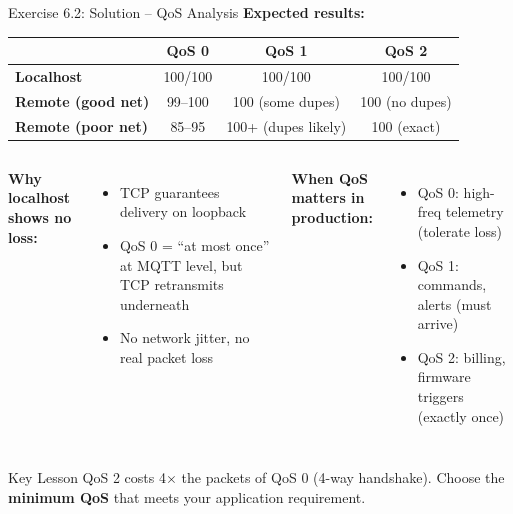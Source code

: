 \documentclass[aspectratio=169,11pt]{beamer}
\begin{document}
\begin{frame}{Exercise 6.2: Solution -- QoS Analysis}
    \textbf{Expected results:}

    \vspace{0.2cm}
    \begin{center}
    \begin{tabular}{lccc}
        \toprule
        & \textbf{QoS 0} & \textbf{QoS 1} & \textbf{QoS 2} \\
        \midrule
        \textbf{Localhost} & 100/100 & 100/100 & 100/100 \\
        \textbf{Remote (good net)} & 99--100 & 100 (some dupes) & 100 (no dupes) \\
        \textbf{Remote (poor net)} & 85--95 & 100+ (dupes likely) & 100 (exact) \\
        \bottomrule
    \end{tabular}
    \end{center}

    \vspace{0.2cm}
    \begin{columns}
        \textbf{Why localhost shows no loss:}
        \begin{itemize}
            \item TCP guarantees delivery on loopback
            \item QoS 0 = ``at most once'' at MQTT level, but TCP retransmits underneath
            \item No network jitter, no real packet loss
        \end{itemize}

        \textbf{When QoS matters in production:}
        \begin{itemize}
            \item QoS 0: high-freq telemetry (tolerate loss)
            \item QoS 1: commands, alerts (must arrive)
            \item QoS 2: billing, firmware triggers (exactly once)
        \end{itemize}
    \end{columns}

    \begin{exampleblock}{Key Lesson}
        QoS 2 costs 4$\times$ the packets of QoS 0 (4-way handshake). Choose the \textbf{minimum QoS} that meets your application requirement.
    \end{exampleblock}
\end{frame}
\end{document}
